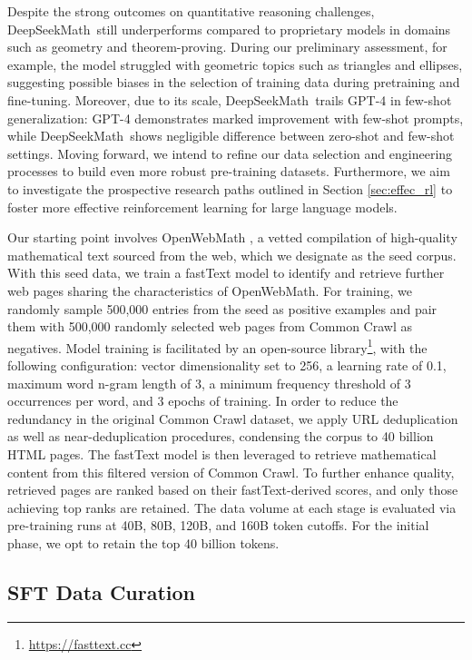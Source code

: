 \begin{itemize}[topsep=0pt]
\begin{itemize}[topsep=0pt]
Despite the strong outcomes on quantitative reasoning challenges, DeepSeekMath~still underperforms compared to proprietary models in domains such as geometry and theorem-proving. During our preliminary assessment, for example, the model struggled with geometric topics such as triangles and ellipses, suggesting possible biases in the selection of training data during pretraining and fine-tuning. Moreover, due to its scale, DeepSeekMath~trails GPT-4 in few-shot generalization: GPT-4 demonstrates marked improvement with few-shot prompts, while DeepSeekMath~shows negligible difference between zero-shot and few-shot settings. Moving forward, we intend to refine our data selection and engineering processes to build even more robust pre-training datasets. Furthermore, we aim to investigate the prospective research paths outlined in Section \ref{sec:effec_rl} to foster more effective reinforcement learning for large language models.

Our starting point involves OpenWebMath \citep{openwebmath}, a vetted compilation of high-quality mathematical text sourced from the web, which we designate as the seed corpus. With this seed data, we train a fastText model \citep{joulin2016fasttext} to identify and retrieve further web pages sharing the characteristics of OpenWebMath. For training, we randomly sample 500,000 entries from the seed as positive examples and pair them with 500,000 randomly selected web pages from Common Crawl as negatives. Model training is facilitated by an open-source library\footnote{\url{https://fasttext.cc}}, with the following configuration: vector dimensionality set to 256, a learning rate of 0.1, maximum word n-gram length of 3, a minimum frequency threshold of 3 occurrences per word, and 3 epochs of training. In order to reduce the redundancy in the original Common Crawl dataset, we apply URL deduplication as well as near-deduplication procedures, condensing the corpus to 40 billion HTML pages. The fastText model is then leveraged to retrieve mathematical content from this filtered version of Common Crawl. To further enhance quality, retrieved pages are ranked based on their fastText-derived scores, and only those achieving top ranks are retained. The data volume at each stage is evaluated via pre-training runs at 40B, 80B, 120B, and 160B token cutoffs. For the initial phase, we opt to retain the top 40 billion tokens.

\subsection{SFT Data Curation}


\end{itemize}
\end{itemize}
